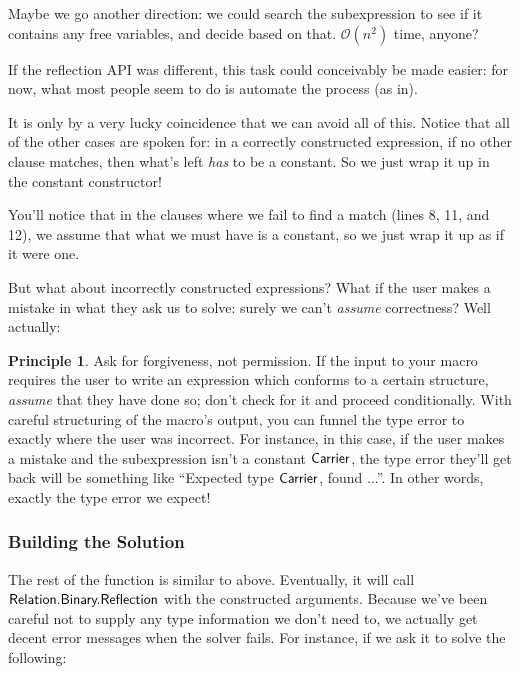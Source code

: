 \documentclass[draft, twocolumn]{article}
\theoremstyle{definition}
\theoremstyle{definition}
\newtheorem{principle}{Principle}[section]
\begin{document}
Maybe we go another direction: we could search the subexpression to see if it
contains any free variables, and decide based on that. \(\mathcal{O}(n^2)\)
time, anyone?

If the reflection API was different, this task could conceivably be made easier:
for now, what most people seem to do is automate the process (as
in\cite{norell_agda-prelude_2018}).

It is only by a very lucky coincidence that we can avoid all of this. Notice
that all of the other cases are spoken for: in a correctly constructed
expression, if no other clause matches, then what's left \emph{has} to be a
constant. So we just wrap it up in the constant constructor!

\resetlinenumber[1]

\begin{linenumbers}
\end{linenumbers}

You'll notice that in the clauses where we fail to find a match (lines 8, 11,
and 12), we assume that what we must have is a constant, so we just wrap it up
as if it were one. 

But what about incorrectly constructed expressions? What if the user makes a
mistake in what they ask us to solve: surely we can't \emph{assume} correctness?
Well actually:

\begin{principle}{Ask for forgiveness, not permission.}
  If the input to your macro requires the user to write an expression which
  conforms to a certain structure, \emph{assume} that they have done so; don't
  check for it and proceed conditionally. With careful structuring of the
  macro's output, you can funnel the type error to exactly where the user was
  incorrect. For instance, in this case, if the user makes a mistake and the
  subexpression isn't a constant \(\AgdaDatatype{Carrier}\), the type error
  they'll get back will be something like ``Expected type
  \(\AgdaDatatype{Carrier}\), found ...''. In other words, exactly the type
  error we expect!
\end{principle}

\subsubsection{Building the Solution}
The rest of the function is similar to above. Eventually, it will call
\(\AgdaModule{Relation.Binary.Reflection}\) with the constructed arguments.
Because we've been careful not to supply any type information we don't need to,
we actually get decent error messages when the solver fails. For instance, if we
ask it to solve the following:
\end{document}
